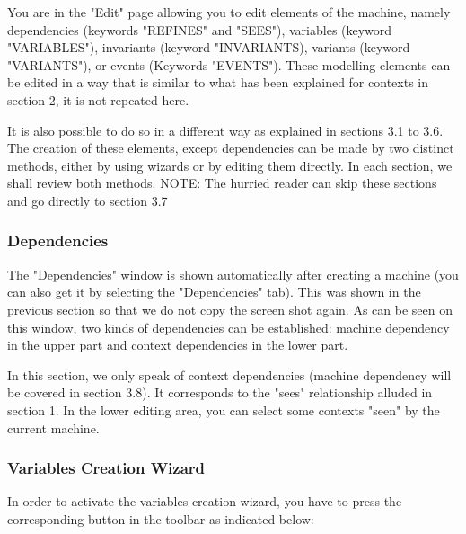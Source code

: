 
You are in the "Edit" page allowing you to edit elements of the machine, namely dependencies (keywords "REFINES" and "SEES"), variables (keyword "VARIABLES"), invariants (keyword "INVARIANTS), variants (keyword "VARIANTS"), or events (Keywords "EVENTS"). These modelling elements can be edited in a way that is similar to what has been explained for contexts in section 2, it is not repeated here.

It is also possible to do so in a different way as explained in sections 3.1 to 3.6. The creation of these elements, except dependencies can be made by two distinct methods, either by using wizards or by editing them directly. In each section, we shall review both methods. NOTE: The hurried reader can skip these sections and go directly to section 3.7 

\subsubsection{Dependencies}

The "Dependencies" window is shown automatically after creating a machine (you can also get it by selecting the "Dependencies" tab). This was shown in the previous section so that we do not copy the screen shot again. As can be seen on this window, two kinds of dependencies can be established: machine dependency in the upper part and context dependencies in the lower part.

In this section, we only speak of context dependencies (machine dependency will be covered in section 3.8). It corresponds to the "sees" relationship alluded in section 1. In the lower editing area, you can select some contexts "seen" by the current machine. 

\subsubsection{Variables Creation Wizard}

In order to activate the variables creation wizard, you have to press the corresponding button in the toolbar as indicated below: 

